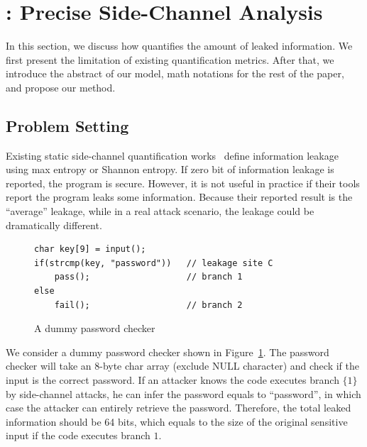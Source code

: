 \section{\tool{}: Precise Side-Channel Analysis}
\label{sec:trace-qif}
In this section, we discuss how \tool{} quantifies the amount of leaked
information. We first present the limitation of existing quantification metrics.
After that, we introduce the abstract of our model, math notations for the
rest of the paper, and propose our method.

\subsection{Problem Setting}
Existing static side-channel quantification
works~\cite{182946,Wichelmann:2018:MFF:3274694.3274741,zhang2010sidebuster} define information
leakage using max entropy or Shannon entropy.  If zero bit of
information leakage is reported, the program is secure. However, it is not
useful in practice if their tools report the program leaks some information.
Because their reported result is the ``average'' leakage, while in a real attack
scenario, the leakage could be dramatically different.

 \begin{figure}[h!]
    \vspace*{-5pt}
    \centering
    \begin{lstlisting}[xleftmargin=.03\textwidth,xrightmargin=.01\textwidth]
char key[9] = input();
if(strcmp(key, "password"))   // leakage site C
    pass();                   // branch 1
else
    fail();                   // branch 2
\end{lstlisting}
\vspace*{-10pt}
    \caption{A dummy password checker}
    \label{fig:password-checker}
\vspace*{-5pt}
\end{figure}

We consider a dummy password checker shown in Figure~\ref{fig:password-checker}.
The password checker will take an 8-byte char array (exclude \textsf{NULL} character) 
and check if the input is the correct password. If an attacker knows the code executes branch
$\{{1\}}$ by side-channel attacks, he can infer the password equals to
``password'', in which case the attacker can entirely retrieve the password.
Therefore, the total leaked information should be 64 bits, which equals to the
size of the original sensitive input if the code executes branch
$1$.

